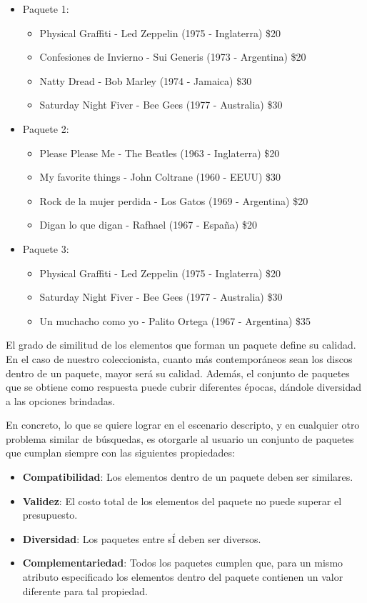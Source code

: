 \begin{itemize}
  \item Paquete 1:
  \begin{itemize}
    \item Physical Graffiti - Led Zeppelin (1975 - Inglaterra) \$20
    \item Confesiones de Invierno - Sui Generis (1973 - Argentina) \$20
    \item Natty Dread - Bob Marley (1974 - Jamaica) \$30
		\item Saturday Night Fiver - Bee Gees (1977 - Australia) \$30
  \end{itemize}
  \item Paquete 2:
  \begin{itemize}
	  \item Please Please Me - The Beatles (1963 - Inglaterra) \$20
	  \item My favorite things - John Coltrane (1960 - EEUU) \$30
	  \item Rock de la mujer perdida - Los Gatos (1969 - Argentina) \$20
		\item Digan lo que digan - Rafhael (1967 - España) \$20
  \end{itemize}
	  \item Paquete 3:
  \begin{itemize}
	  \item Physical Graffiti - Led Zeppelin (1975 - Inglaterra) \$20
		\item Saturday Night Fiver - Bee Gees (1977 - Australia) \$30
	  \item Un muchacho como yo - Palito Ortega (1967 - Argentina) \$35
  \end{itemize}
\end{itemize}


El grado de similitud de los elementos que forman un paquete define su calidad. En el caso de nuestro coleccionista, cuanto 
más contemporáneos sean los discos dentro de un paquete, mayor será su calidad. Además, el conjunto de paquetes que se obtiene como respuesta puede cubrir diferentes épocas, dándole diversidad a las opciones brindadas. 

En concreto, lo que se quiere lograr en el escenario descripto, y en cualquier otro problema similar de búsquedas, es otorgarle al usuario un conjunto de paquetes que cumplan siempre con las siguientes propiedades: 

\begin{itemize}
  \item \textbf{Compatibilidad}: Los elementos dentro de un paquete deben ser similares.
  \item \textbf{Validez}: El costo total de los elementos del paquete no puede superar el presupuesto.
  \item \textbf{Diversidad}: Los paquetes entre sÍ deben ser diversos.
  \item \textbf{Complementariedad}: Todos los paquetes cumplen que, para un mismo atributo especificado los elementos dentro del paquete contienen un valor diferente para tal propiedad.
\end{itemize}

